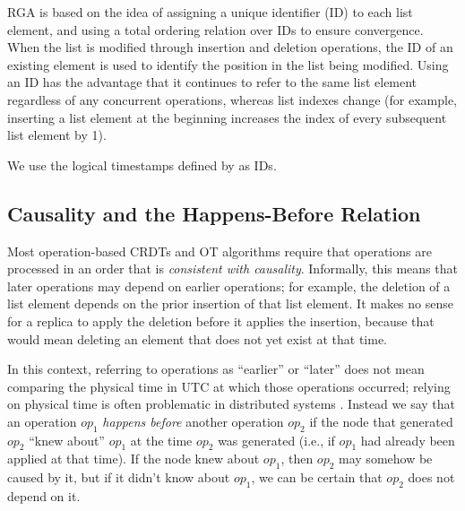 RGA is based on the idea of assigning a unique identifier (ID) to each list element, and using a
total ordering relation over IDs to ensure convergence. When the list is modified through insertion
and deletion operations, the ID of an existing element is used to identify the position in the list
being modified. Using an ID has the advantage that it continues to refer to the same list element
regardless of any concurrent operations, whereas list indexes change (for example, inserting a list
element at the beginning increases the index of every subsequent list element by 1).

We use the logical timestamps defined by \citet{Lamport:1978jq} as IDs.


\subsection{Causality and the Happens-Before Relation}\label{sect.causality}

Most operation-based CRDTs and OT algorithms require that operations are processed in an order that
is \emph{consistent with causality}. Informally, this means that later operations may depend on
earlier operations; for example, the deletion of a list element depends on the prior insertion of
that list element. It makes no sense for a replica to apply the deletion before it applies the
insertion, because that would mean deleting an element that does not yet exist at that time.

In this context, referring to operations as ``earlier'' or ``later'' does not mean comparing the
physical time in UTC at which those operations occurred; relying on physical time is often
problematic in distributed systems \cite{Sheehy:2015jm}. Instead we say that an operation
$\mathit{op}_1$ \emph{happens before} another operation $\mathit{op}_2$ if the node that generated
$\mathit{op}_2$ ``knew about'' $\mathit{op}_1$ at the time $\mathit{op}_2$ was generated (i.e., if
$\mathit{op}_1$ had already been applied at that time). If the node knew about $\mathit{op}_1$, then
$\mathit{op}_2$ may somehow be caused by it, but if it didn't know about $\mathit{op}_1$, we can be
certain that $\mathit{op}_2$ does not depend on it.

